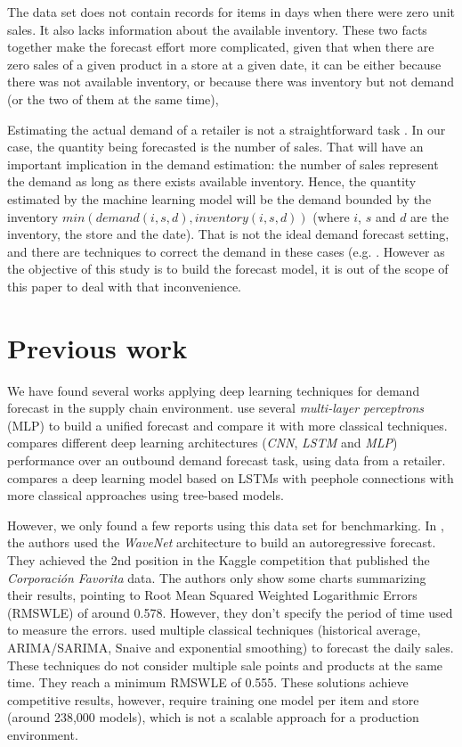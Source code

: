 \documentclass{elsarticle}
\begin{document}
	
	The data set does not contain records for items in days when there were zero unit sales. It also lacks information about the available inventory. These two facts together make the forecast effort more complicated, given that when there are zero sales of a given product in a store at a given date, it can be either because there was not available inventory, or because there was inventory but not demand (or the two of them at the same time),
	
	Estimating the actual demand of a retailer is not a straightforward task \cite{Deep2019}. In our case, the quantity being forecasted is the number of sales. That will have an important implication in the demand estimation: the number of sales represent the demand as long as there exists available inventory. Hence, the quantity estimated by the machine learning model will be the demand bounded by the inventory $min(demand(i,s,d), inventory(i,s,d))$ (where $i$, $s$ and $d$ are the inventory, the store and the date). That is not the ideal demand forecast setting, and there are techniques to correct the demand in these cases (e.g. \cite{Bell2000}. However as the objective of this study is to build the forecast model, it is out of the scope of this paper to deal with that inconvenience.
	
		
	\section{Previous work}	\label{sec:prevwork}
	We have found several works applying deep learning techniques for demand forecast in the supply chain environment. \cite{Kilimci2019} use several \textit{multi-layer perceptrons} (MLP) to build a unified forecast and compare it with more classical techniques. \cite{Talupula2018} compares different deep learning architectures (\textit{CNN}, \textit{LSTM} and \textit{MLP}) performance over an outbound demand forecast task, using data from a retailer. \cite{Helmini2019} compares a deep learning model based on LSTMs with peephole connections with more classical approaches using tree-based models. 
	
	However, we only found a few reports using this data set for benchmarking.  	In \cite{kechyn2018}, the authors used the \textit{WaveNet} \cite{vanderoord2016} architecture to build an autoregressive forecast. They achieved the 2nd position in the Kaggle competition that published the \textit{Corporación Favorita} data. The authors only show some charts summarizing their results, pointing to Root Mean Squared Weighted Logarithmic Errors (RMSWLE) of around 0.578. However, they don't specify the period of time used to measure the errors. \cite{Steves2018} used multiple classical techniques (historical average, ARIMA/SARIMA, Snaive and exponential smoothing) to forecast the daily sales. These techniques do not consider multiple sale points and products at the same time. They reach a minimum RMSWLE of 0.555. These solutions achieve competitive results, however, require training one model per item and store (around 238,000 models), which is not a scalable approach for a production environment.
\end{document}
